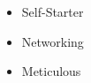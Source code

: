 %
%
%

\twocolumnsection
{
\begin{skills}
\end{skills}}
{
\vspace{1em}
\begin{itemize}
	\item Self-Starter
	\item Networking              
    \item Meticulous
\end{itemize}
}
